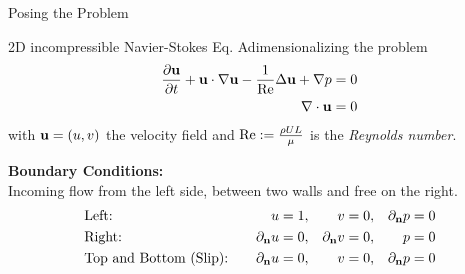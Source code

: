 \begin{frame}{Posing the Problem}

    \begin{block}{2D incompressible Navier-Stokes Eq.}
        Adimensionalizing the problem 
        \begin{align*}
          \frac{\partial \textbf{u}}{\partial t} + \textbf{u} \cdot \nabla \textbf{u} - \frac{1}{\mathrm{Re}} \Delta \textbf{u} + \nabla p = 0 \label{eq:Ns_normalized} \\
          \nabla\cdot\boldsymbol{\mathrm{u}} = 0 \notag
        \end{align*}
        with $\boldsymbol{\mathrm{u}} = (u,v)$ the velocity field and $\mathrm{Re} := \frac{\rho U L}{\mu}$ is the \textit{Reynolds number}.
    \end{block}


    \textbf{Boundary Conditions:}\\
    Incoming flow from the left side, between two walls and free on the right.
    \begin{align*}
        &\text{Left:}\quad & u &= 1,  & v &= 0, & \partial_{\boldsymbol{\mathrm{n}}} p &= 0 \\
        &\text{Right:}\quad & \partial_{\boldsymbol{\mathrm{n}}} u &= 0, & \partial_{\boldsymbol{\mathrm{n}}} v &= 0, & p &= 0 \\
        &\text{Top and Bottom (Slip):}\quad & \partial_{\boldsymbol{\mathrm{n}}} u &= 0, & v &= 0, & \partial_{\boldsymbol{\mathrm{n}}} p &= 0
    \end{align*}



\end{frame}


